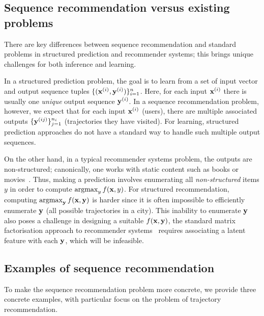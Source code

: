%
\subsection{Sequence recommendation versus existing problems}

There are key differences between sequence recommendation and %
standard problems in structured prediction and recommender systems;
this brings unique challenges for both inference and learning.

In a structured prediction problem, the goal is to learn from a set of
input vector and output sequence tuples %
$\{ (\mathbf{x}^{({i})}, \mathbf{y}^{({i})}) \}_{i = 1}^n$. Here,
for each input $\mathbf{x}^{({i})}$ there is usually one \emph{unique} output sequence $\mathbf{y}^{({i})}$.
In a sequence recommendation problem, however, we expect that %
for each input $\mathbf{x}^{({i})}$ (\eg users),
there %
are multiple associated outputs %
$\{ \mathbf{y}^{({ij})} \}_{j=1}^{n_i}$ (\eg trajectories they have visited).
For learning, structured prediction approaches do not have a standard way to handle such multiple output sequences.

On the other hand, in a typical recommender systems problem, the outputs are non-structured; canonically, one works with {static} content such as books or movies~\citep{Goldberg:1992,Sarwar:2001,Netflix}.
Thus, making a prediction involves enumerating all {\em non-structured} items $y$ in order to compute $\operatorname*{argmax}_y f(\mathbf{x},y)$.
For structured recommendation, computing $\operatorname*{argmax}_{\mathbf{y}} f(\mathbf{x},\mathbf{y})$ is harder since it is often impossible to efficiently enumerate $\mathbf{y}$ (\eg all possible trajectories in a city).
This inability to enumerate $\mathbf{y}$ also poses a challenge in designing a suitable $f(\mathbf{x},\mathbf{y})$, \eg
the standard matrix factorisation approach to recommender systems~\citep{Koren:2009}
requires associating a latent feature with each $\mathbf{y}$, which will be infeasible.


%
\subsection{Examples of sequence recommendation}
\label{sec:trajrec}

To make the sequence recommendation problem more concrete,
we provide three concrete examples,
with particular focus on the problem of trajectory recommendation.


